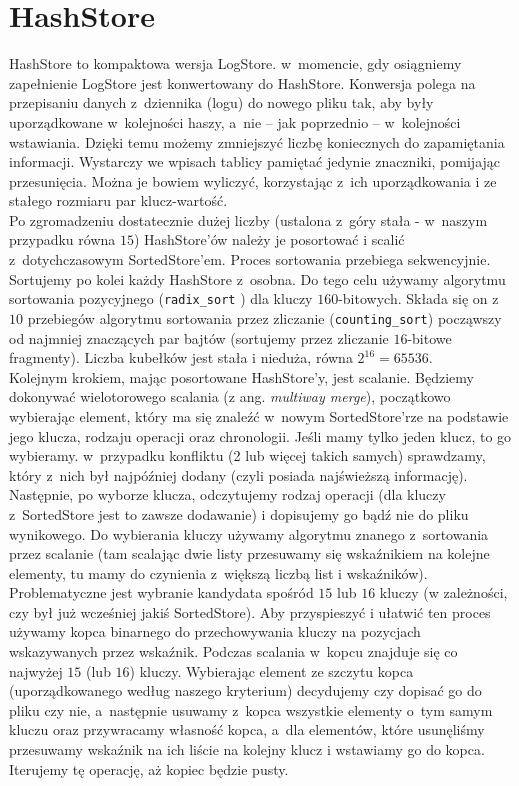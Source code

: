 \documentclass[declaration,shortabstract,masc]{iithesis}
\begin{document}
		\section{HashStore}
			HashStore to kompaktowa wersja LogStore. w~momencie, gdy osiągniemy zapełnienie LogStore jest konwertowany do HashStore. Konwersja polega na przepisaniu danych z~dziennika (logu) do nowego pliku tak, aby były uporządkowane w~kolejności haszy, a~nie -- jak poprzednio -- w~kolejności wstawiania. Dzięki temu możemy zmniejszyć liczbę koniecznych do zapamiętania informacji. Wystarczy we wpisach tablicy pamiętać jedynie znaczniki, pomijając przesunięcia. Można je bowiem wyliczyć, korzystając z~ich uporządkowania i ze stałego rozmiaru par klucz-wartość.\\
			\indent Po zgromadzeniu dostatecznie dużej liczby (ustalona z~góry stała - w~naszym przypadku równa $15$) HashStore'ów należy je posortować i scalić z~dotychczasowym SortedStore'em. Proces sortowania przebiega sekwencyjnie. Sortujemy po kolei każdy HashStore z~osobna. Do tego celu używamy algorytmu sortowania pozycyjnego (\texttt{radix\_sort} \cite{Cormen}) dla kluczy $160$-bitowych. Składa się on z~$10$ przebiegów algorytmu sortowania przez zliczanie (\texttt{counting\_sort}) począwszy od najmniej znaczących par bajtów (sortujemy przez zliczanie $16$-bitowe fragmenty). Liczba kubełków jest stała i nieduża, równa $2^{16} = 65536$.\\
			\indent Kolejnym krokiem, mając posortowane HashStore'y, jest scalanie. Będziemy dokonywać wielotorowego scalania (z ang. \textit{multiway merge}), początkowo wybierając element, który ma się znaleźć w~nowym SortedStore'rze na podstawie jego klucza, rodzaju operacji oraz chronologii. Jeśli mamy tylko jeden klucz, to go wybieramy. w~przypadku konfliktu (2 lub więcej takich samych) sprawdzamy, który z~nich był najpóźniej dodany (czyli posiada najświeższą informację). Następnie, po wyborze klucza, odczytujemy rodzaj operacji (dla kluczy z~SortedStore jest to zawsze dodawanie) i dopisujemy go bądź nie do pliku wynikowego. Do wybierania kluczy używamy algorytmu znanego z~sortowania przez scalanie (tam scalając dwie listy przesuwamy się wskaźnikiem na kolejne elementy, tu mamy do czynienia z~większą liczbą list i wskaźników). Problematyczne jest wybranie kandydata spośród $15$ lub $16$ kluczy (w zależności, czy był już wcześniej jakiś SortedStore). Aby przyspieszyć i ułatwić ten proces używamy kopca binarnego do przechowywania kluczy na pozycjach wskazywanych przez wskaźnik. Podczas scalania w~kopcu znajduje się co najwyżej $15$ (lub $16$) kluczy. Wybierając element ze szczytu kopca (uporządkowanego według naszego kryterium) decydujemy czy dopisać go do pliku czy nie, a~następnie usuwamy z~kopca wszystkie elementy o~tym samym kluczu oraz przywracamy własność kopca, a~dla elementów, które usunęliśmy przesuwamy wskaźnik na ich liście na kolejny klucz i wstawiamy go do kopca. Iterujemy tę operację, aż kopiec będzie pusty.
\end{document}
